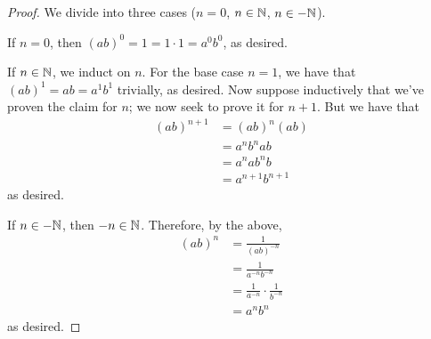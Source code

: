 \documentclass[../main.tex]{subfiles}
\begin{document}
\begin{enumerate}[label={\textbf{\arabic*.}}]
\begin{proof}
        We divide into three cases ($n=0$, $n\in\mathbb{N}$, $n\in-\mathbb{N}$).\par\smallskip
        If $n=0$, then $(ab)^0=1=1\cdot 1=a^0b^0$, as desired.\par
        If $n\in\mathbb{N}$, we induct on $n$. For the base case $n=1$, we have that $(ab)^1=ab=a^1b^1$ trivially, as desired. Now suppose inductively that we've proven the claim for $n$; we now seek to prove it for $n+1$. But we have that
        \begin{align*}
            (ab)^{n+1} &= (ab)^n(ab)\\
            &= a^nb^nab\\
            &= a^nab^nb\\
            &= a^{n+1}b^{n+1}
        \end{align*}
        as desired.\par
        If $n\in-\mathbb{N}$, then $-n\in\mathbb{N}$. Therefore, by the above,
        \begin{align*}
            (ab)^n &= \frac{1}{(ab)^{-n}}\\
            &= \frac{1}{a^{-n}b^{-n}}\\
            &= \frac{1}{a^{-n}}\cdot\frac{1}{b^{-n}}\\
            &= a^nb^n
        \end{align*}
        as desired.
    \end{proof}
\end{enumerate}
\end{document}
